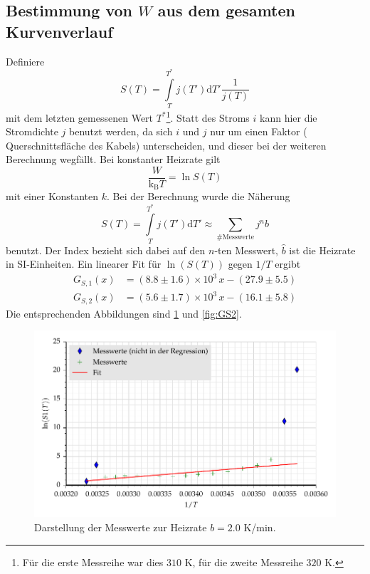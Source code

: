 \subsection{Bestimmung von $W$ aus dem gesamten Kurvenverlauf}
Definiere
\begin{equation}
S(T)=\int\limits_T^{T^*} j(T') \text{d}T' \frac{1}{j(T)}
\end{equation}
mit dem letzten gemessenen Wert $T^*$\footnote{Für die erste Messreihe war dies $310$ K, für 
die zweite Messreihe $320$ K.}. Statt des Stroms $i$ kann hier die 
Stromdichte $j$ benutzt werden, da sich $i$ und $j$ nur um einen Faktor (
Querschnittsfläche des Kabels) unterscheiden, und dieser bei der weiteren 
Berechnung wegfällt.
Bei konstanter Heizrate gilt
\begin{equation}
\frac{W}{\text{k}_\text{B} T}=\ln S(T)
\end{equation}
mit einer Konstanten $k$. Bei der Berechnung wurde die Näherung
\begin{equation}
S(T)=\int\limits_T^{T^*} j(T') \text{d}T' \approx \sum\limits_{\#\text{Messwerte}} j^n  \hat{b}
\end{equation}
benutzt. Der Index bezieht sich dabei auf den $n$-ten Messwert, $\hat{b}$ ist die
Heizrate in SI-Einheiten. Ein linearer Fit für $\ln(S(T))$ gegen $1/T$ ergibt
%
%
\begin{align}
G_{S,1}(x)&= (8.8 \pm 1.6 )\times 10^{3} \,x - (27.9 \pm 5.5)  \\
G_{S,2}(x)&= (5.6 \pm 1.7 )\times 10^{3} \,x - (16.1 \pm 5.8)
\end{align}
Die entsprechenden Abbildungen sind \ref{fig:GS1} und \ref{fig:GS2}.
\begin{figure}[h]
\centering
\includegraphics[scale=0.8]{../skript/S1.pdf}
\caption{Darstellung der Messwerte zur Heizrate $b=2.0$ K/min.}
\label{fig:GS1}
\end{figure}
